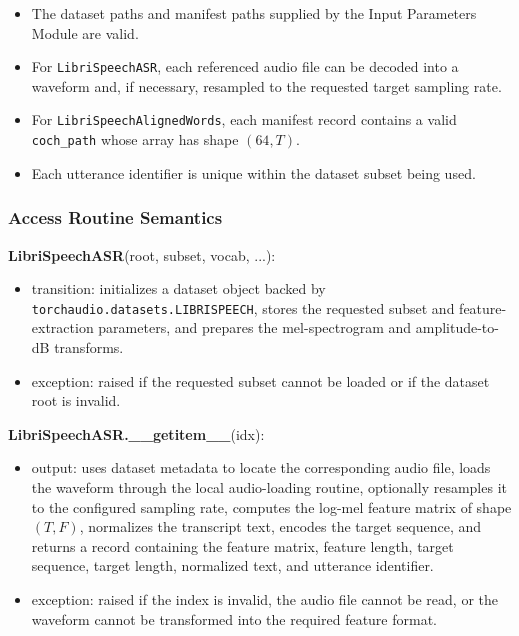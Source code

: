 \documentclass[12pt, titlepage]{article}
\begin{document}
\begin{itemize}
    \item The dataset paths and manifest paths supplied by the Input Parameters Module are valid.

    \item For \texttt{LibriSpeechASR}, each referenced audio file can be decoded into a waveform and, if necessary, resampled to the requested target sampling rate.

    \item For \texttt{LibriSpeechAlignedWords}, each manifest record contains a valid \texttt{coch\_path} whose array has shape $(64, T)$.

    \item Each utterance identifier is unique within the dataset subset being used.
\end{itemize}

\subsubsection{Access Routine Semantics}

\noindent \textbf{LibriSpeechASR}(root, subset, vocab, ...):
\begin{itemize}
    \item transition: initializes a dataset object backed by
    \texttt{torchaudio.datasets.LIBRISPEECH}, stores the requested subset and feature-extraction parameters, and prepares the mel-spectrogram and amplitude-to-dB transforms.
    \item exception: raised if the requested subset cannot be loaded or if the dataset root is invalid.
\end{itemize}

\noindent \textbf{LibriSpeechASR.\_\_getitem\_\_}(idx):
\begin{itemize}
    \item output: uses dataset metadata to locate the corresponding audio file, loads the waveform through the local audio-loading routine, optionally resamples it to the configured sampling rate, computes the log-mel feature matrix of shape $(T, F)$, normalizes the transcript text, encodes the target sequence, and returns a record containing the feature matrix, feature length, target sequence, target length, normalized text, and utterance identifier.
    \item exception: raised if the index is invalid, the audio file cannot be read, or the waveform cannot be transformed into the required feature format.
\end{itemize}
\end{document}
